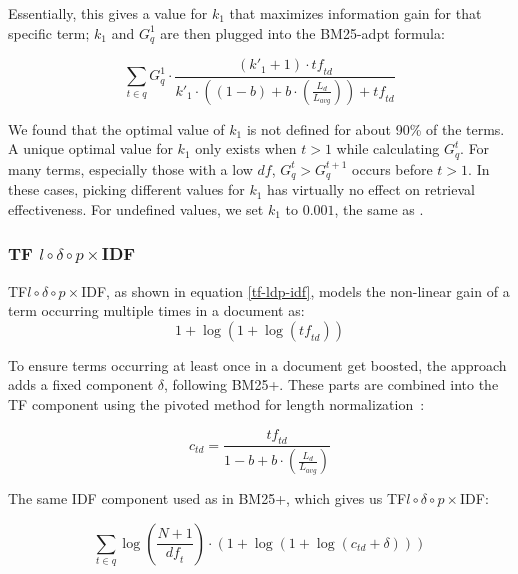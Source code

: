Essentially, this gives a value for $k_1$ that maximizes information gain for that specific term; $k_1$ and $G^1_q$ are then plugged into the BM25-adpt formula: 

\begin{equation}
	\label{bm25-adpt}
	\sum_{t\in q}G_q^1\cdot\frac{\left(k'_1+1\right)\cdot \mathit{tf}_{\mathit{td}}}{k'_1\cdot\left(\left(1-b\right)+b\cdot\left(\frac{L_d}{L_{\mathit{avg}}}\right)\right)+\mathit{tf}_{\mathit{td}}}
\end{equation}

We found that the optimal value of $k_1$ is not defined for about 90\% of the terms. A unique optimal value for $k_1$ only exists when $t > 1$ while calculating $G^t_q$. For many terms, especially those with a low $\mathit{df}$, $G^t_q > G^{t+1}_q$ occurs before $t > 1$. In these cases, picking different values for $k_1$ has virtually no effect on retrieval effectiveness. For undefined values, we set $k_1$ to $0.001$, the same as \citet{trotman-bm25}.

\subsubsection{TF $l\circ\delta\circ p\times$IDF~\citep{tf-ldp-idf}}
TF$l\circ\delta\circ p\times$IDF, as shown in equation \ref{tf-ldp-idf}, models the non-linear gain of a term occurring multiple times in a document as:
\begin{equation}
	1+\log\left(1+\log\left(\mathit{tf}_{\mathit{td}}\right)\right) 
\end{equation}

To ensure terms occurring at least once in a document get boosted, the approach adds a fixed component $\delta$, following BM25+. These parts are combined into the TF component using the pivoted method for length normalization~\citep{ctd}:

\begin{equation}
	c_{\mathit{td}} = \frac{\mathit{tf}_{\mathit{td}}}{1-b+b\cdot\left(\frac{L_d}{L_{\mathit{avg}}}\right)}
\end{equation}

The same IDF component used as in BM25+, which gives us TF$l\circ\delta\circ p\times$IDF: 

\begin{equation}
	\label{tf-ldp-idf}
	\sum_{t\in q}\log\left(\frac{N+1}{\mathit{df}_t}\right)\cdot\left(1+\log\left(1+\log\left(c_{\mathit{td}}+\delta\right)\right)\right)
\end{equation}

